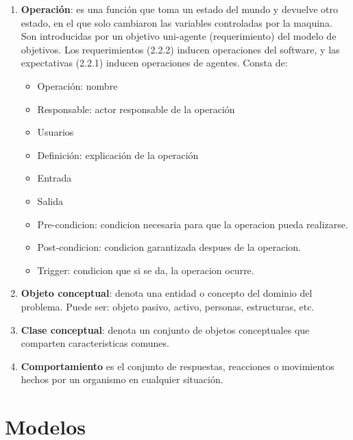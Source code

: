\begin{enumerate}
\item {\bf Operaci\'on}: es una funci\'on que toma un estado del mundo y devuelve otro estado, en el que solo cambiaron las variables controladas por la maquina. Son introducidas por un objetivo uni-agente (requerimiento) del modelo de objetivos. Los requerimientos (2.2.2) inducen operaciones del software, y las expectativas (2.2.1) inducen operaciones de agentes. Consta de: 
  \begin{itemize}
    \item Operaci\'on: nombre
    \item Responsable: actor responsable de la operaci\'on
    \item Usuarios
    \item Definici\'on: explicaci\'on de la operaci\'on
    \item Entrada
    \item Salida
    \item Pre-condicion: condicion necesaria para que la operacion pueda realizarse.
    \item Post-condicion: condicion garantizada despues de la operacion. 
    \item Trigger: condicion que si se da, la operacion ocurre. 
  \end{itemize}
  
\item {\bf Objeto conceptual}: denota una entidad o concepto del dominio del problema. Puede ser: objeto pasivo, activo, personas, estructuras, etc. 

\item {\bf Clase conceptual}: denota un conjunto de objetos conceptuales que comparten caracteristicas comunes. 

\item {\bf Comportamiento} es el conjunto de respuestas, reacciones o movimientos hechos por un organismo en cualquier situaci\'on. 

\end{enumerate}

\section{Modelos}

